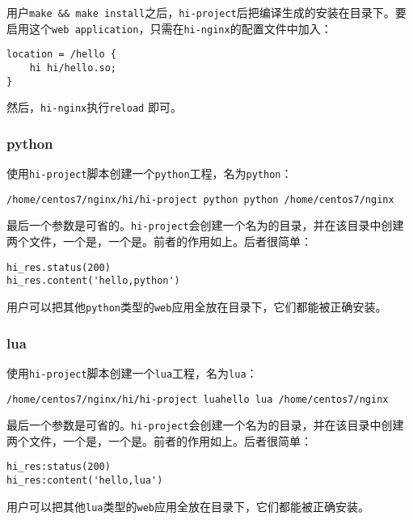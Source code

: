 用户\texttt{make \&\& make install}之后，\texttt{hi-project}后把编译生成的安装在目录下。要启用这个\texttt{web application}，只需在\texttt{hi-nginx}的配置文件中加入：
\begin{lstlisting}
location = /hello {
	hi hi/hello.so;
}
\end{lstlisting}
然后，\texttt{hi-nginx}执行\texttt{reload} 即可。


\subsubsection{python}
使用\texttt{hi-project}脚本创建一个\texttt{python}工程，名为\texttt{python}：
\begin{lstlisting}
/home/centos7/nginx/hi/hi-project python python /home/centos7/nginx
\end{lstlisting}
最后一个参数是可省的。\texttt{hi-project}会创建一个名为的目录，并在该目录中创建两个文件，一个是，一个是。前者的作用如上。后者很简单：
\begin{lstlisting}
hi_res.status(200)
hi_res.content('hello,python')
\end{lstlisting}
用户可以把其他\texttt{python}类型的\texttt{web}应用全放在目录下，它们都能被正确安装。
\subsubsection{lua}
使用\texttt{hi-project}脚本创建一个\texttt{lua}工程，名为\texttt{lua}：
\begin{lstlisting}
/home/centos7/nginx/hi/hi-project luahello lua /home/centos7/nginx
\end{lstlisting}
最后一个参数是可省的。\texttt{hi-project}会创建一个名为的目录，并在该目录中创建两个文件，一个是，一个是。前者的作用如上。后者很简单：
\begin{lstlisting}
hi_res:status(200)
hi_res:content('hello,lua')
\end{lstlisting}
用户可以把其他\texttt{lua}类型的\texttt{web}应用全放在目录下，它们都能被正确安装。


